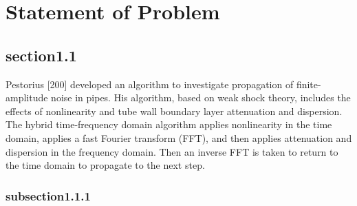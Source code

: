 \vspace*{-80mm}
\chapter{Statement of Problem} \label{chapter1:introduction}

\section{section1.1}
Pestorius [200] developed an algorithm to investigate propagation of finite-am\-pli\-tude noise in pipes. His algorithm, based on weak shock theory, includes the effects of nonlinearity and tube wall boundary layer attenuation and dispersion. The hybrid time-frequency domain algorithm applies nonlinearity in the time domain, applies a fast Fourier transform (FFT), and then applies attenuation and dispersion in the frequency domain.  Then an inverse FFT is taken to return to the time domain to propagate to the next step.

\subsection{subsection1.1.1}

